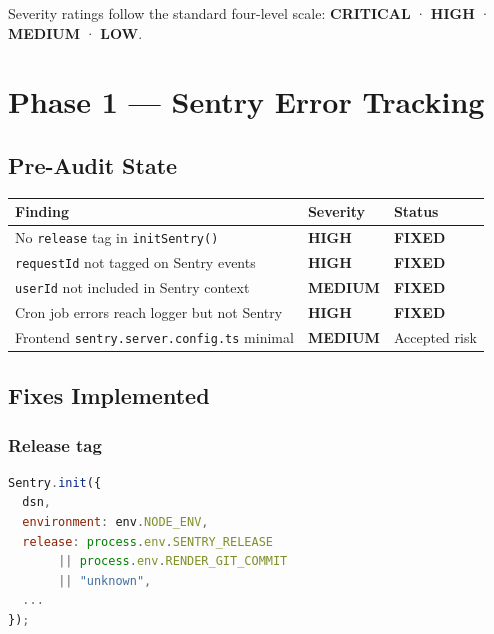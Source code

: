 \documentclass[12pt,a4paper]{article}
\newcommand{\cellok}[1]{\cellcolor{ok!15}\textbf{\color{ok}#1}}
\newcommand{\cellwarn}[1]{\cellcolor{warn!20}\textbf{\color{warn}#1}}
\newcommand{\cellinfo}[1]{\cellcolor{info!10}\textbf{\color{info}#1}}
\begin{document}
Severity ratings follow the standard four-level scale:
\textbf{\color{crit}CRITICAL} · \textbf{\color{warn}HIGH} · \textbf{\color{info}MEDIUM} · \textbf{\color{ok}LOW}.

\newpage

\section{Phase 1 — Sentry Error Tracking}

\subsection{Pre-Audit State}

\begin{longtable}{p{5cm}p{3.5cm}p{5.5cm}}
\toprule
\rowcolor{tableheadbg}
\textbf{\color{white}Finding} & \textbf{\color{white}Severity} & \textbf{\color{white}Status} \\
\midrule
No \texttt{release} tag in \texttt{initSentry()} & \cellwarn{HIGH} & \cellok{FIXED} \\
\texttt{requestId} not tagged on Sentry events & \cellwarn{HIGH} & \cellok{FIXED} \\
\texttt{userId} not included in Sentry context & \cellinfo{MEDIUM} & \cellok{FIXED} \\
Cron job errors reach logger but not Sentry & \cellwarn{HIGH} & \cellok{FIXED} \\
Frontend \texttt{sentry.server.config.ts} minimal & \cellinfo{MEDIUM} & Accepted risk \\
\bottomrule
\end{longtable}

\subsection{Fixes Implemented}

\subsubsection{Release tag}

\begin{lstlisting}[language=JavaScript,caption={src/config/sentry.js — release tag}]
Sentry.init({
  dsn,
  environment: env.NODE_ENV,
  release: process.env.SENTRY_RELEASE
       || process.env.RENDER_GIT_COMMIT
       || "unknown",
  ...
});
\end{lstlisting}
\end{document}
